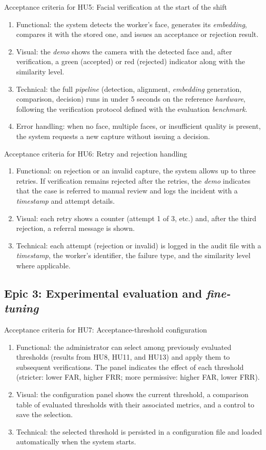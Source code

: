 \documentclass[
  11pt, %
]{charter}
\begin{document}
Acceptance criteria for HU5: Facial verification at the start of the shift
\begin{enumerate}
  \item Functional: the system detects the worker's face, generates its \textit{embedding}, compares it with the stored one, and issues an acceptance or rejection result.
  \item Visual: the \textit{demo} shows the camera with the detected face and, after verification, a green (accepted) or red (rejected) indicator along with the similarity level.
  \item Technical: the full \textit{pipeline} (detection, alignment, \textit{embedding} generation, comparison, decision) runs in under 5 seconds on the reference \textit{hardware}, following the verification protocol defined with the evaluation \textit{benchmark}.
  \item Error handling: when no face, multiple faces, or insufficient quality is present, the system requests a new capture without issuing a decision.
\end{enumerate}

Acceptance criteria for HU6: Retry and rejection handling
\begin{enumerate}
  \item Functional: on rejection or an invalid capture, the system allows up to three retries. If verification remains rejected after the retries, the \textit{demo} indicates that the case is referred to manual review and logs the incident with a \textit{timestamp} and attempt details.
  \item Visual: each retry shows a counter (attempt 1 of 3, etc.) and, after the third rejection, a referral message is shown.
  \item Technical: each attempt (rejection or invalid) is logged in the audit file with a \textit{timestamp}, the worker's identifier, the failure type, and the similarity level where applicable.
\end{enumerate}

\subsection{Epic 3: Experimental evaluation and \textit{fine-tuning}}

Acceptance criteria for HU7: Acceptance-threshold configuration
\begin{enumerate}
  \item Functional: the administrator can select among previously evaluated thresholds (results from HU8, HU11, and HU13) and apply them to subsequent verifications. The panel indicates the effect of each threshold (stricter: lower FAR, higher FRR; more permissive: higher FAR, lower FRR).
  \item Visual: the configuration panel shows the current threshold, a comparison table of evaluated thresholds with their associated metrics, and a control to save the selection.
  \item Technical: the selected threshold is persisted in a configuration file and loaded automatically when the system starts.
\end{enumerate}
\end{document}

